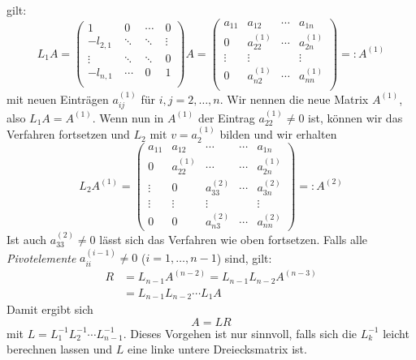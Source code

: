 \documentclass[a4paper]{scrartcl}
\numberwithin{equation}{section}
\begin{document}
gilt:
\[
L_1 A =
\begin{pmatrix}
1 &\ 0 &\ \cdots &\ 0 \\ 
-l_{2,1} &\ \ddots &\ \ddots &\ \vdots \\
\vdots  &\ \ddots &\ \ddots &\ 0 \\
-l_{n,1} &\ \cdots &\ 0 &\ 1 \\
\end{pmatrix}
A
=
\begin{pmatrix}
a_{11} & a_{12} & \cdots & a_{1n}\\
0 & a_{22}^{(1)} & \cdots & a_{2n}^{(1)} \\
\vdots & \vdots &  & \vdots\\
0 & a_{n2}^{(1)} & \cdots & a_{nn}^{(1)}\\
\end{pmatrix}
=: A^{(1)}
\]
mit neuen Einträgen $a_{ij}^{(1)}$ für $i,j=2,\dotsc,n$.
Wir nennen die neue  Matrix $A^{(1)}$, also $L_1 A= A^{(1)}$.
Wenn nun in $A^{(1)}$ der Eintrag $a_{22}^{(1)}\neq 0$  ist, können  wir das
Verfahren fortsetzen und $L_2$ mit $v=a_2^{(1)}$ bilden und wir erhalten
\[
L_2A^{(1)} = \begin{pmatrix}
a_{11} &a_{12} &  \cdots  & \cdots & a_{1n}\\
0 & a_{22}^{(1)}&  \cdots & \cdots & a_{2n}^{(1)}\\
\vdots &  0 & a_{33}^{(2)} & \cdots & a_{3n}^{(2)} \\
\vdots & \vdots & \vdots  &  & \vdots \\
0 & 0 & a_{n3}^{(2)} &\cdots & a_{nn}^{(2)}
\end{pmatrix} =: A^{(2)}
\]
Ist auch $a_{33}^{(2)}\neq 0$  lässt sich das Verfahren wie oben fortsetzen.
Falls alle \emph{Pivotelemente} $a_{ii}^{(i-1)}\neq 0$ ($i=1,\dotsc,n-1$) sind, gilt:
\begin{align*}
R &=L_{n-1}A^{(n-2)} = L_{n-1}L_{n-2}A^{(n-3)}\\
&= L_{n-1}L_{n-2}\dotsb L_1A
\end{align*}
Damit ergibt sich
\[
A=LR
\]
mit $L=L_1^{-1}L_2^{-1}\dotsb L_{n-1}^{-1}$.
Dieses Vorgehen ist nur sinnvoll, falls sich die $L_k^{-1}$ leicht berechnen lassen und $L$ eine linke untere Dreiecksmatrix ist.
\end{document}
